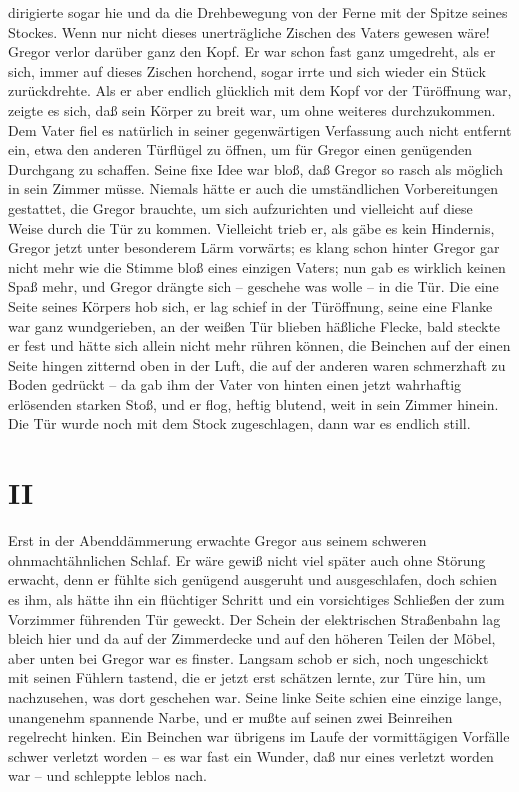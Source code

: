 dirigierte sogar hie und da die Drehbewegung von der Ferne mit der
Spitze seines Stockes. Wenn nur nicht dieses unerträgliche Zischen des
Vaters gewesen wäre! Gregor verlor darüber ganz den Kopf. Er war schon
fast ganz umgedreht, als er sich, immer auf dieses Zischen horchend,
sogar irrte und sich wieder ein Stück zurückdrehte. Als er aber endlich
glücklich mit dem Kopf vor der Türöffnung war, zeigte es sich, daß sein
Körper zu breit war, um ohne weiteres durchzukommen. Dem Vater fiel es
natürlich in seiner gegenwärtigen Verfassung auch nicht entfernt ein,
etwa den anderen Türflügel zu öffnen, um für Gregor einen genügenden
Durchgang zu schaffen. Seine fixe Idee war bloß, daß Gregor so rasch als
möglich in sein Zimmer müsse. Niemals hätte er auch die umständlichen
Vorbereitungen gestattet, die Gregor brauchte, um sich aufzurichten und
vielleicht auf diese Weise durch die Tür zu kommen. Vielleicht trieb er,
als gäbe es kein Hindernis, Gregor jetzt unter besonderem Lärm
vorwärts; es klang schon hinter Gregor gar nicht mehr wie die Stimme
bloß eines einzigen Vaters; nun gab es wirklich keinen Spaß mehr, und
Gregor drängte sich -- geschehe was wolle -- in die Tür. Die eine Seite
seines Körpers hob sich, er lag schief in der Türöffnung, seine eine
Flanke war ganz wundgerieben, an der weißen Tür blieben häßliche Flecke,
bald steckte er fest und hätte sich allein nicht mehr rühren können, die
Beinchen auf der einen Seite hingen zitternd oben in der Luft, die auf
der anderen waren schmerzhaft zu Boden gedrückt -- da gab ihm der Vater
von hinten einen jetzt wahrhaftig erlösenden starken Stoß, und er flog,
heftig blutend, weit in sein Zimmer hinein. Die Tür wurde noch mit dem
Stock zugeschlagen, dann war es endlich still.

\quebra\section{II}

Erst in der Abenddämmerung erwachte Gregor aus seinem schweren
ohnmachtähnlichen Schlaf. Er wäre gewiß nicht viel später auch ohne
Störung erwacht, denn er fühlte sich genügend ausgeruht und
ausgeschlafen, doch schien es ihm, als hätte ihn ein flüchtiger Schritt
und ein vorsichtiges Schließen der zum Vorzimmer führenden Tür geweckt.
Der Schein der elektrischen Straßenbahn lag bleich hier und da auf der
Zimmerdecke und auf den höheren Teilen der Möbel, aber unten bei Gregor
war es finster. Langsam schob er sich, noch ungeschickt mit seinen
Fühlern tastend, die er jetzt erst schätzen lernte, zur Türe hin, um
nachzusehen, was dort geschehen war. Seine linke Seite schien eine
einzige lange, unangenehm spannende Narbe, und er mußte auf seinen zwei
Beinreihen regelrecht hinken. Ein Beinchen war übrigens im Laufe der
vormittägigen Vorfälle schwer verletzt worden -- es war fast ein
Wunder, daß nur eines verletzt worden war -- und schleppte leblos nach.

